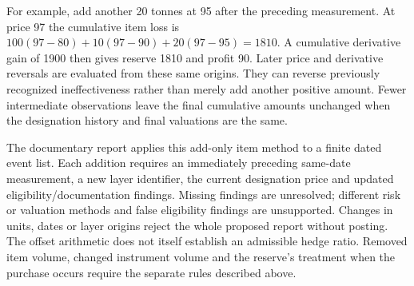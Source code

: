 For example, add another 20 tonnes at 95 after the preceding measurement.
At price 97 the cumulative item loss is
$100(97-80)+10(97-90)+20(97-95)=1810$.
A cumulative derivative gain of 1900 then gives reserve 1810 and profit
90. Later price and derivative reversals are evaluated from these same
origins. They can reverse previously recognized ineffectiveness rather
than merely add another positive amount. Fewer intermediate observations
leave the final cumulative amounts unchanged when the designation history
and final valuations are the same.

The documentary  report applies this
add-only item method to a finite dated event list. Each addition requires
an immediately preceding same-date measurement, a new layer identifier,
the current designation price and updated eligibility/documentation
findings. Missing findings are unresolved; different risk or valuation
methods and false eligibility findings are unsupported. Changes in units,
dates or layer origins reject the whole proposed report without posting.
The offset arithmetic does not itself establish an admissible hedge ratio.
Removed item volume, changed instrument volume and the reserve's treatment
when the purchase occurs require the separate rules described above.

